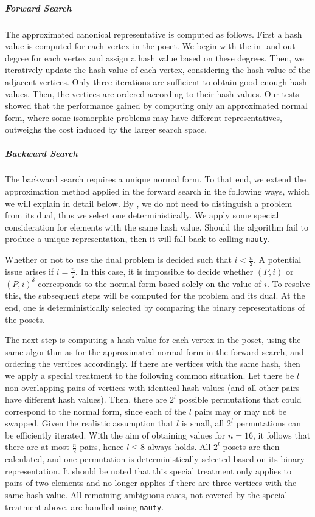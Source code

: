 \documentclass[a4paper,UKenglish,cleveref, autoref, thm-restate, anonymous]{lipics-v2021}
\newcommand{\dual}[1]{{#1}^{\delta}}
\begin{document}
\subparagraph{Forward Search}
The approximated canonical representative is computed as follows.
First a hash value is computed for each vertex in the poset.
We begin with the in- and out-degree for each vertex and assign a hash value based on these degrees.
Then, we iteratively update the hash value of each vertex, considering the hash value of the adjacent vertices.
Only three iterations are sufficient to obtain good-enough hash values.
Then, the vertices are ordered according to their hash values.
Our tests showed that the performance gained by computing only an approximated normal form, where some isomorphic problems may have different representatives, outweighs the cost induced by the larger search space.

\subparagraph{Backward Search} \label{sec:backward:normal_form}
The backward search requires a unique normal form.
To that end, we extend the approximation method applied in the forward search in the following ways, which we will explain in detail below.
By , we do not need to distinguish a problem from its dual, thus we select one deterministically.
We apply some special consideration for elements with the same hash value.
Should the algorithm fail to produce a unique representation, then it will fall back to calling \texttt{nauty}.

Whether or not to use the dual problem is decided such that $i < \tfrac{n}{2}$.
A potential issue arises if $i = \tfrac{n}{2}$.
In this case, it is impossible to decide whether $(P, i)$ or $\dual{(P, i)}$ corresponds to the normal form based solely on the value of $i$.
To resolve this, the subsequent steps will be computed for the problem and its dual.
At the end, one is deterministically selected by comparing the binary representations of the posets.

The next step is computing a hash value for each vertex in the poset, using the same algorithm as for the approximated normal form in the forward search, and ordering the vertices accordingly.
If there are vertices with the same hash, then we apply a special treatment to the following common situation.
Let there be $l$ non-overlapping pairs of vertices with identical hash values (and all other pairs have different hash values).
Then, there are $2^l$ possible permutations that could correspond to the normal form, since each of the $l$ pairs may or may not be swapped.
Given the realistic assumption that $l$ is small, all $2^l$ permutations can be efficiently iterated.
With the aim of obtaining values for $n = 16$, it follows that there are at most $\frac{n}{2}$ pairs, hence $l \leq 8$ always holds.
All $2^l$ posets are then calculated, and one permutation is deterministically selected based on its binary representation.
It should be noted that this special treatment only applies to pairs of two elements and no longer applies if there are three vertices with the same hash value.
All remaining ambiguous cases, not covered by the special treatment above, are handled using \texttt{nauty}.
\end{document}
